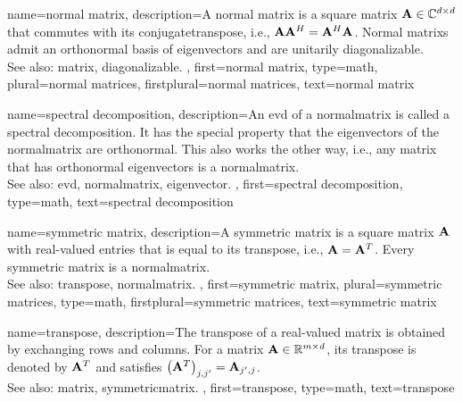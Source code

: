 {name={normal matrix},
	description={A normal \gls{matrix} is a square \gls{matrix} ${\bf A} \in \mathbb{C}^{d \times d}$ 
		that commutes with its \gls{conjugatetranspose}, i.e., ${\bf A}{\bf A}^{H}={\bf A}^{H}{\bf A}$. 
		Normal \glspl{matrix} admit an orthonormal \gls{basis} of \glspl{eigenvector} and are 
		unitarily \gls{diagonalizable}.
                 \\
                 See also: \gls{matrix}, \gls{diagonalizable}. },
	first={normal matrix},
    	type=math, 
	plural={normal matrices},
	firstplural={normal matrices},
	text={normal matrix}
}

{name={spectral decomposition},
	description={An \gls{evd} of a \gls{normalmatrix} is called a spectral decomposition. 
		It has the special property that the \glspl{eigenvector} of the \gls{normalmatrix} are orthonormal. 
		This also works the other way, i.e., any \gls{matrix} that has orthonormal \glspl{eigenvector} is a \gls{normalmatrix}.
		\\
		See also: \gls{evd}, \gls{normalmatrix}, \gls{eigenvector}. },
	first={spectral decomposition},
    	type=math,
	text={spectral decomposition}
}

{name={symmetric matrix},
	description={A symmetric \gls{matrix} is a square \gls{matrix} ${\bf A}$ 
		with real-valued entries that is equal to its \gls{transpose}, i.e., ${\bf A}={\bf A}^{T}$. Every 
		symmetric \gls{matrix} is a \gls{normalmatrix}.
                 \\
                 See also: \gls{transpose}, \gls{normalmatrix}. },
	first={symmetric matrix},
	plural={symmetric matrices},
    	type=math,
	firstplural={symmetric matrices},
	text={symmetric matrix}
}

{name={transpose},
	description={The transpose of a real-valued \gls{matrix} is obtained by exchanging 
		rows and columns. For a \gls{matrix} ${\bf A} \in \mathbb{R}^{m \times d}$, 
		its transpose is denoted by ${\bf A}^{T}$ and satisfies 
		$\big({\bf A}^{T}\big)_{j,j'}={\bf A}_{j',j}$.
		\\
		See also: \gls{matrix}, \gls{symmetricmatrix}. },
 	first={transpose},
    	type=math, 
 	text={transpose}
 }

